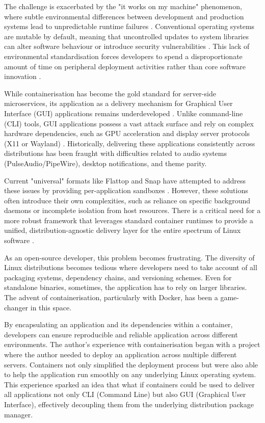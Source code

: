 \documentclass[journal,onecolumn]{IEEEtran}
\begin{document}
The challenge is exacerbated by the "it works on my machine" phenomenon, where subtle environmental differences between development and production systems lead to unpredictable runtime failures \cite{Singh2025}. Conventional operating systems are mutable by default, meaning that uncontrolled updates to system libraries can alter software behaviour or introduce security vulnerabilities \cite{Singh2025}. This lack of environmental standardisation forces developers to spend a disproportionate amount of time on peripheral deployment activities rather than core software innovation \cite{Zam2025}\cite{Alser2022}.

While containerisation has become the gold standard for server-side microservices, its application as a delivery mechanism for Graphical User Interface (GUI) applications remains underdeveloped \cite{Zam2025}. Unlike command-line (CLI) tools, GUI applications possess a vast attack surface and rely on complex hardware dependencies, such as GPU acceleration and display server protocols (X11 or Wayland) \cite{Zam2025}. Historically, delivering these applications consistently across distributions has been fraught with difficulties related to audio systems (PulseAudio/PipeWire), desktop notifications, and theme parity.

Current "universal" formats like Flattop and Snap have attempted to address these issues by providing per-application sandboxes \cite{Dunlap2022}. However, these solutions often introduce their own complexities, such as reliance on specific background daemons or incomplete isolation from host resources. There is a critical need for a more robust framework that leverages standard container runtimes to provide a unified, distribution-agnostic delivery layer for the entire spectrum of Linux software \cite{Zam2025}.

As an open-source developer, this problem becomes frustrating. The diversity of Linux distributions becomes tedious where developers need to take account of all packaging systems, dependency chains, and versioning schemes. Even for standalone binaries, sometimes, the application has to rely on larger libraries. The advent of containerisation, particularly with Docker, has been a game-changer in this space. 

By encapsulating an application and its dependencies within a container, developers can ensure reproducible and reliable application across different environments. The author’s experience with containerisation began with a project where the author needed to deploy an application across multiple different servers. Containers not only simplified the deployment process but were also able to help the application run smoothly on any underlying Linux operating system. This experience sparked an idea that what if containers could be used to deliver all applications not only CLI (Command Line) but also GUI (Graphical User Interface), effectively decoupling them from the underlying distribution package manager.
\end{document}

